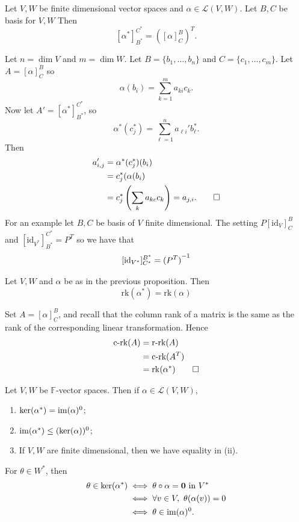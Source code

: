 \documentclass{article}
\newcommand{\F}{\mathbb{F}}
\newcommand{\rk}{\mathrm{rk}}
\renewcommand{\id}{\mathrm{id}}
\begin{document}
\begin{proposition}
  Let $ V,W $ be finite dimensional vector spaces and $ \alpha\in \mathcal L(V,W) $. Let $ B,C $ be basis for $ V,W $ Then
  \[
	  [\alpha^*]_{B^*}^{C^*}=\left([\alpha]^B_C\right)^T.
  \]
\end{proposition}
\pf Let $ n=\dim V $ and $ m=\dim W $. Let $ B=\{b_1,\dots, b_n\} $ and $ C=\{c_1,\dots, c_m\} $. Let $ A=[\alpha]_C^B $ so
\[
	\alpha(b_i)=\sum_{k=1}^ma_{ki}c_k.
\]
Now let $ A'=[\alpha^*]_{B^*}^{C^*} $, so
\[
	\alpha^*(c_j^*)=\sum_{\ell =1}^na_{\ell i}'b_\ell^*.
\]
Then
\begin{align*}
	a_{i,j}'&=\alpha^*(c_j^*)(b_i) \\
		&=c_j^*(\alpha(b_i)\\
		&=c_j^*\left(\sum_ka_{kc}c_k\right)=a_{j,i}.\qed
\end{align*}
For an example let $ B,C $ be basis of $ V $ finite dimensional. The setting $ P[\id_V]_C^B $ and $ [\id_{V^*}]_{B^*}^{C^*}=P^T $ so we have that
\[
	[\id_{V^*}]^{B^*}_{C^*}=\inv{(P^T)}
\]
\begin{corollary}
  Let $ V,W $ and $ \alpha$ be as in the previous proposition. Then
  \[
    \rk(\alpha^*)=\rk(\alpha)
  \]
\end{corollary}
\pf Set $ A=[\alpha]_C^B $, and recall that the column rank of a matrix is the same as the rank of the corresponding linear transformation. Hence
\begin{align*}
	\text{c-rk}(A)&=\text{r-rk}(A)\\
		      &=\text{c-rk}(A^T)\\
		      &=\rk(\alpha^*)\qed
\end{align*}
\begin{proposition}
  Let $ V,W $ be $ \F $-vector spaces. Then if $ \alpha\in\mathcal L(V,W) $,
  \begin{enumerate}
	  \item $ \ker(\alpha^*)=\operatorname{im}(\alpha)^0 $;
	  \item $ \operatorname{im}(\alpha^*)\le (\ker(\alpha))^0 $;
	  \item If $ V,W $ are finite dimensional, then we have equality in (ii).
  \end{enumerate}
\end{proposition}
\pf For $ \theta\in W^* $, then
\begin{align*}
	\theta\in \ker(\alpha^*)&\iff \theta\circ\alpha=\mathbf 0 \text{ in } V^*\\
				&\iff \forall v\in V,\ \theta(\alpha(v)) =0\\
				&\iff \theta\in\operatorname{im}(\alpha)^0.
\end{align*}
\end{document}
